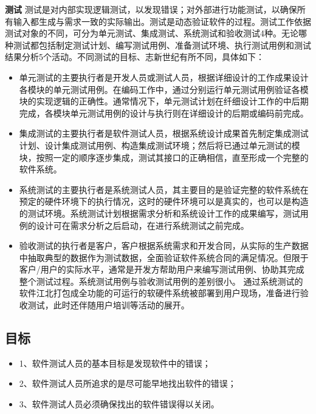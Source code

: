 \documentclass[UTF8,nofonts]{ctexart}
\makeatletter
\renewcommand{\section}{\@startsection{section}{1}{0mm}
  {-\baselineskip}{0.5\baselineskip}{\fontsize{16pt}{16pt}\bf\leftline}}
\makeatother
\begin{document}
\section{\textbf{测试}}
测试是对内部实现逻辑测试，以发现错误；对外部进行功能测试，以确保所有输入都生成与需求一致的实际输出。测试是动态验证软件的过程。测试工作依据测试对象的不同，可分为单元测试、集成测试、系统测试和验收测试4种。无论哪种测试都包括制定测试计划、编写测试用例、准备测试环境、执行测试用例和测试结果分析5个活动。不同测试的目标、志新世纪有所不同，具体如下：
\begin{itemize}
 \setlength{\itemsep}{0pt}
 \setlength{\parskip}{0pt}
 \setlength{\parsep}{0pt}
\item	单元测试的主要执行者是开发人员或测试人员，根据详细设计的工作成果设计各模块的单元测试用例。在编码工作中，通过分别运行单元测试用例验证各模块的实现逻辑的正确性。通常情况下，单元测试计划在纤细设计工作的中后期完成，各模块单元测试用例的设计与执行则在详细设计的后期或编码前完成。
\item	集成测试的主要执行者是软件测试人员，根据系统设计成果首先制定集成测试计划、设计集成测试用例、构造集成测试环境；然后将已通过单元测试的模块，按照一定的顺序逐步集成，测试其接口的正确相信，直至形成一个完整的软件系统。
\item	系统测试的主要执行者是系统测试人员，其主要目的是验证完整的软件系统在预定的硬件环境下的执行情况，这时的硬件环境可以是真实的，也可以是构造的测试环境。系统测试计划根据需求分析和系统设计工作的成果编写，测试用例的设计可在需求分析之后启动，在进行系统测试之前完成。
\item	验收测试的执行者是客户，客户根据系统需求和开发合同，从实际的生产数据中抽取典型的数据作为测试数据，全面验证软件系统合同的满足情况。但限于客户/用户的实际水平，通常是开发方帮助用户来编写测试用例、协助其完成整个测试过程。系统测试用例与验收测试用例的差别很小。
通过系统测试的软件江北打包成全功能的可运行的软硬件系统被部署到用户现场，准备进行验收测试，此时还伴随用户培训等活动的展开。
\end{itemize}
\subsection{\textbf{目标}}
\begin{itemize}
 \setlength{\itemsep}{0pt}
 \setlength{\parskip}{0pt}
 \setlength{\parsep}{0pt}
\item 1、软件测试人员的基本目标是发现软件中的错误；
\item 2、软件测试人员所追求的是尽可能早地找出软件的错误；
\item	3、软件测试人员必须确保找出的软件错误得以关闭。
\end{itemize}	
\end{document}
